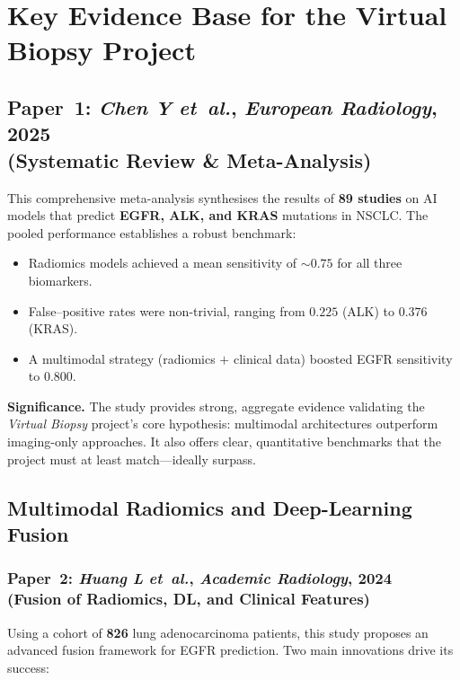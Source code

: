 \documentclass[11pt,a4paper]{article}
\begin{document}
\section*{Key Evidence Base for the Virtual Biopsy Project}

\subsection*{Paper~1: \textit{Chen Y} \textit{et~al.}, \textit{European Radiology}, 2025\\
(Systematic Review \& Meta-Analysis)}

This comprehensive meta-analysis synthesises the results of \textbf{89 studies} on AI models that predict \textbf{EGFR, ALK, and KRAS} mutations in NSCLC.\cite{Chen2025}
The pooled performance establishes a robust benchmark:

\begin{itemize}[itemsep=2pt]
  \item Radiomics models achieved a mean sensitivity of $\sim 0.75$ for all three biomarkers.
  \item False--positive rates were non-trivial, ranging from $0.225$ (ALK) to $0.376$ (KRAS).
  \item A multimodal strategy (radiomics $+$ clinical data) boosted EGFR sensitivity to $0.800$.\cite{Chen2025b}
\end{itemize}

\textbf{Significance.} 
The study provides strong, aggregate evidence validating the \emph{Virtual Biopsy} project’s core hypothesis: multimodal architectures outperform imaging-only approaches. 
It also offers clear, quantitative benchmarks that the project must at least match—ideally surpass.

\subsection*{Multimodal Radiomics and Deep-Learning Fusion}

\subsubsection*{Paper~2: \textit{Huang L} \textit{et~al.}, \textit{Academic Radiology}, 2024\\
(Fusion of Radiomics, DL, and Clinical Features)}

Using a cohort of \textbf{826} lung adenocarcinoma patients, this study proposes an advanced fusion framework for EGFR prediction.\cite{Huang2024}
Two main innovations drive its success:
\end{document}
